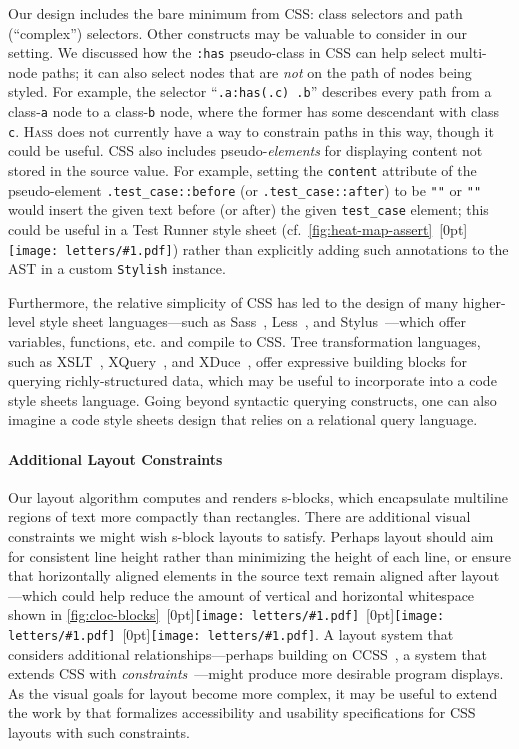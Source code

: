 \documentclass[acmsmall, screen]{acmart}
\newcommand{\xmark}{\ding{55}}
\newcommand{\parahead}[1]
  {\paragraph{\textbf{#1}}}
\newcommand{\hass}
{\textsc{Hass}}
\newcommand{\cssAttr}[1]
{\texttt{#1}}
\newcommand{\cssClass}[1]
  {\texttt{#1}}
\newcommand{\figBubble}[1]{\raisebox{-0.03in}[0pt]{\texttt{[image: letters/\#1.pdf]}}}
\newcommand{\refBubble}[1]
  {~\figBubble{#1}}
\begin{document}
Our design includes the bare minimum from CSS: class selectors and path (``complex'') selectors.
Other constructs may be valuable to consider in our setting.
We discussed how the \cssClass{:has} pseudo-class in CSS can help select multi-node paths;
it can also select nodes that are \emph{not} on the path of nodes being styled.
For example, the selector ``\verb+.a:has(.c) .b+'' describes every path from a class-\cssClass{a} node to a class-\cssClass{b} node, where the former has some descendant with class \cssClass{c}.
\hass{} does not currently have a way to constrain paths in this way, though it could be useful. CSS also includes pseudo-\emph{elements} for displaying content not stored in the source value.
For example, setting the \cssAttr{content} attribute of the pseudo-element \verb+.test_case::before+ (or \verb+.test_case::after+) to be \texttt{"}\cmark\texttt{"} or \texttt{"}\xmark\texttt{"} would insert the given text before (or after) the given \cssClass{test\_case} element; this could be useful in a Test Runner style sheet (cf.~\autoref{fig:heat-map-assert}\refBubble{a}) rather than explicitly adding such annotations to the AST in a custom \texttt{Stylish} instance.



Furthermore, the relative simplicity of CSS has led to the design of many higher-level style sheet languages---such as Sass~\citep{sass}, Less~\citep{less}, and Stylus~\citep{stylus}---which offer variables, functions, etc. and compile to CSS.
Tree transformation languages, such as XSLT~\citep{XSLT}, XQuery~\citep{XQuery}, and XDuce~\citep{Hosoya2003}, offer expressive building blocks for querying richly-structured data, which may be useful to incorporate into a code style sheets language.
Going beyond syntactic querying constructs, one can also imagine a code style sheets design that relies on a relational query language.









\parahead{Additional Layout Constraints}

Our layout algorithm computes and renders s-blocks, which encapsulate multiline regions of text more compactly than rectangles.
There are additional visual constraints we might wish s-block layouts to satisfy.
Perhaps layout should aim for consistent line height rather than minimizing the height of each line, or ensure that horizontally aligned elements in the source text remain aligned after layout---which could help reduce the amount of vertical and horizontal whitespace shown in \autoref{fig:cloc-blocks}\refBubble{a}\refBubble{b}\refBubble{c}.
A layout system that considers additional relationships---perhaps building on CCSS~\citep{Badros1999}, a system that extends CSS with \emph{constraints}~\citep{Cassowary}---might produce more desirable program displays.
As the visual goals for layout become more complex, it may be useful to extend the work by \citet{Panchekha2018} that formalizes accessibility and usability specifications for CSS layouts with such constraints.
\end{document}
